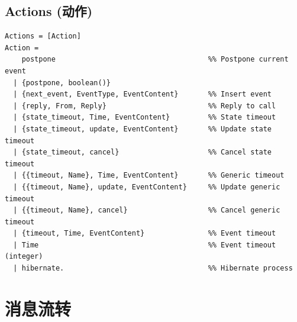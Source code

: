 \documentclass[a4paper,11pt]{article}
\begin{document}
\subsection{Actions (动作)}

\begin{lstlisting}[style=erlangstyle]
Actions = [Action]
Action =
    postpone                                    %% Postpone current event
  | {postpone, boolean()}
  | {next_event, EventType, EventContent}       %% Insert event
  | {reply, From, Reply}                        %% Reply to call
  | {state_timeout, Time, EventContent}         %% State timeout
  | {state_timeout, update, EventContent}       %% Update state timeout
  | {state_timeout, cancel}                     %% Cancel state timeout
  | {{timeout, Name}, Time, EventContent}       %% Generic timeout
  | {{timeout, Name}, update, EventContent}     %% Update generic timeout
  | {{timeout, Name}, cancel}                   %% Cancel generic timeout
  | {timeout, Time, EventContent}               %% Event timeout
  | Time                                        %% Event timeout (integer)
  | hibernate.                                  %% Hibernate process
\end{lstlisting}


\section{消息流转}
\end{document}
